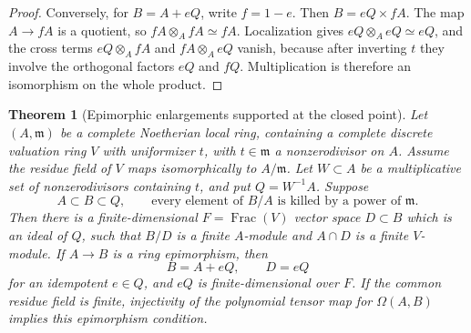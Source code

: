 \documentclass[11pt,a4paper]{article}
\newtheorem{theorem}{Theorem}[section]
\theoremstyle{definition}
\begin{document}
\begin{proof}
Conversely, for $B=A+eQ$, write $f=1-e$. Then
$B=eQ\times fA$. The map $A\to fA$ is a quotient,
so $fA\otimes_A fA\simeq fA$. Localization gives
$eQ\otimes_A eQ\simeq eQ$, and the cross terms
$eQ\otimes_A fA$ and $fA\otimes_A eQ$ vanish,
because after inverting $t$ they involve the
orthogonal factors $eQ$ and $fQ$. Multiplication
is therefore an isomorphism on the whole product.
\end{proof}

\begin{theorem}[Epimorphic enlargements supported at the closed point]\label{result-34}
Let $(A,\mathfrak m)$ be a complete Noetherian local
ring, containing a complete discrete valuation ring
$V$ with uniformizer $t$, with $t\in\mathfrak m$
a nonzerodivisor on $A$. Assume the residue field
of $V$ maps isomorphically to $A/\mathfrak m$.
Let $W\subset A$ be a multiplicative set of
nonzerodivisors containing $t$, and put $Q=W^{-1}A$.
Suppose
\[
 A\subset B\subset Q,\qquad
 \text{every element of }B/A\text{ is killed by a power
 of }\mathfrak m.
\]
Then there is a finite-dimensional
$F=\operatorname{Frac}(V)$ vector space $D\subset B$
which is an ideal of $Q$, such that $B/D$ is a finite
$A$-module and $A\cap D$ is a finite $V$-module.
If $A\to B$ is a ring epimorphism, then
\begin{equation}
                         B=A+eQ,\qquad D=eQ                 \label{equation-71}
\end{equation}
for an idempotent $e\in Q$, and $eQ$ is finite-dimensional
over $F$. If the common residue field is finite,
injectivity of the polynomial tensor map for
$\Omega(A,B)$ implies this epimorphism condition.
\end{theorem}
\end{document}

